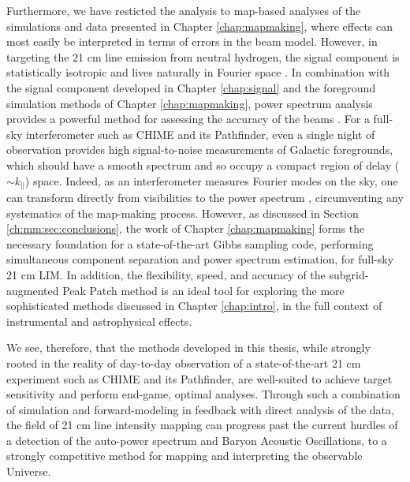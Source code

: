 Furthermore, we have resticted the analysis to map-based analyses of the simulations and data presented in Chapter \ref{chap:mapmaking}, where effects can most easily be interpreted in terms of errors in the beam model. However, in targeting the 21 cm line emission from neutral hydrogen, the signal component is statistically isotropic and lives naturally in Fourier space \citep{mmodes2}. In combination with the signal component developed in Chapter \ref{chap:signal} and the foreground simulation methods of Chapter \ref{chap:mapmaking}, power spectrum analysis provides a powerful method for assessing the accuracy of the beams \citep{wedge1, wedge2}. For a full-sky interferometer such as CHIME and its Pathfinder, even a single night of observation provides high signal-to-noise measurements of Galactic foregrounds, which should have a smooth spectrum and so occupy a compact region of delay ($\sim k_\parallel$) space. Indeed, as an interferometer measures Fourier modes on the sky, one can transform directly from visibilities to the power spectrum \citep{mfaps, mmodes2}, circumventing any systematics of the map-making process. However, as discussed in Section \ref{ch:mm:sec:conclusions}, the work of Chapter \ref{chap:mapmaking} forms the necessary foundation for a state-of-the-art Gibbs sampling code, performing simultaneous component separation and power spectrum estimation, for full-sky 21 cm LIM. In addition, the flexibility, speed, and accuracy of the subgrid-augmented Peak Patch method is an ideal tool for exploring the more sophisticated methods discussed in Chapter \ref{chap:intro}, in the full context of instrumental and astrophysical effects.

We see, therefore, that the methods developed in this thesis, while strongly rooted in the reality of day-to-day observation of a state-of-the-art 21 cm experiment such as CHIME and its Pathfinder, are well-suited to achieve target sensitivity and perform end-game, optimal analyses. Through such a combination of simulation and forward-modeling in feedback with direct analysis of the data, the field of 21 cm line intensity mapping can progress past the current hurdles of a detection of the auto-power spectrum and Baryon Acoustic Oscillations, to a strongly competitive method for mapping and interpreting the observable Universe.